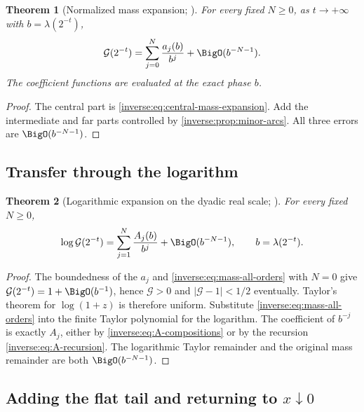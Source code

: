 \documentclass[11pt,oneside]{article}
\newtheorem{theorem}{Theorem}[section]
\theoremstyle{definition}
\theoremstyle{remark}
\begin{document}
\begin{theorem}[Normalized mass expansion; \Formalized]
\label{inverse:thm:mass-all-orders}
For every fixed $N\geq0$, as $t\to+\infty$ with
$b=\lambda(2^{-t})$,
\begin{equation}
 \mathcal G(2^{-t})
 =\sum_{j=0}^{N}\frac{a_j(b)}{b^j}
  +\BigO(b^{-N-1}). \label{inverse:eq:mass-all-orders}
\end{equation}
The coefficient functions are evaluated at the exact phase $b$.
\end{theorem}

\begin{proof}
The central part is \eqref{inverse:eq:central-mass-expansion}.  Add the
intermediate and far parts controlled by \cref{inverse:prop:minor-arcs}.  All
three errors are $\BigO(b^{-N-1})$.
\end{proof}

\subsection{Transfer through the logarithm}

\begin{theorem}[Logarithmic expansion on the dyadic real scale;
\Formalized]
\label{inverse:thm:log-dyadic-all-orders}
For every fixed $N\geq0$,
\begin{equation}
 \log\mathcal G(2^{-t})
 =\sum_{j=1}^{N}\frac{A_j(b)}{b^j}
  +\BigO(b^{-N-1}),
 \qquad b=\lambda(2^{-t}). \label{inverse:eq:log-mass-all-orders}
\end{equation}
\end{theorem}

\begin{proof}
The boundedness of the $a_j$ and \eqref{inverse:eq:mass-all-orders} with $N=0$
give $\mathcal G(2^{-t})=1+\BigO(b^{-1})$, hence
$\mathcal G>0$ and $|\mathcal G-1|<1/2$ eventually.  Taylor's theorem for
$\log(1+z)$ is therefore uniform.  Substitute
\eqref{inverse:eq:mass-all-orders} into the finite Taylor polynomial for the
logarithm.  The coefficient of $b^{-j}$ is exactly $A_j$, either by
\eqref{inverse:eq:A-compositions} or by the recursion
\eqref{inverse:eq:A-recursion}.  The logarithmic Taylor remainder and the
original mass remainder are both $\BigO(b^{-N-1})$.
\end{proof}

\subsection{Adding the flat tail and returning to \texorpdfstring{\(x\downarrow0\)}{x to 0}}
\end{document}
